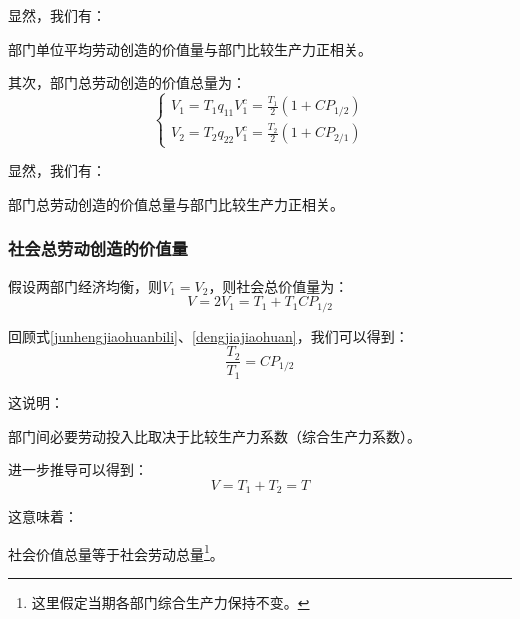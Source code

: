显然，我们有：

\begin{theorem}
    部门单位平均劳动创造的价值量与部门比较生产力正相关\cite[98]{CaiJiMingCongXiaYiJieZhiLunDaoGuangYiJieZhiLunXiuDingBan2022}。
\end{theorem}

其次，部门总劳动创造的价值总量为：
\begin{equation}
    \begin{cases}
        V_1 = T_1q_{11}V_1^c = \frac{T_1}{2}\left( 1 + \mathit{CP}_{1/2} \right) \\
        V_2 = T_2q_{22}V_1^c = \frac{T_2}{2}\left( 1 + \mathit{CP}_{2/1} \right)
    \end{cases}
\end{equation}

显然，我们有：

\begin{theorem}
    部门总劳动创造的价值总量与部门比较生产力正相关\cite[100]{CaiJiMingCongXiaYiJieZhiLunDaoGuangYiJieZhiLunXiuDingBan2022}。
\end{theorem}

\subsubsection{社会总劳动创造的价值量}

假设两部门经济均衡，则$ V_1 = V_2 $，则社会总价值量为：
\begin{equation}
    V = 2V_1 = T_1 + T_1 \mathit{CP}_{1/2}
\end{equation}

回顾式\ref{junhengjiaohuanbili}、\ref{dengjiajiaohuan}，我们可以得到\cite[290]{CaiJiMingCongGuDianZhengZhiJingJiXueDaoZhongGuoTeSeSheHuiZhuYiZhengZhiJingJiXueJiYuZhongGuoShiJiaoDeZhengZhiJingJiXueYanBianShangCe2023}：
\begin{equation}
    \frac{T_2}{T_1} = \mathit{CP}_{1/2}
\end{equation}

这说明：

\begin{theorem}
    部门间必要劳动投入比取决于比较生产力系数（综合生产力系数）。
\end{theorem}

进一步推导可以得到：
\begin{equation}
    V = T_1 + T_2 = T
\end{equation}

这意味着：
\begin{theorem}
    社会价值总量等于社会劳动总量\cite[75]{CaiJiMingCongXiaYiJieZhiLunDaoGuangYiJieZhiLunXiuDingBan2022}\footnote{这里假定当期各部门综合生产力保持不变。}。
\end{theorem}

